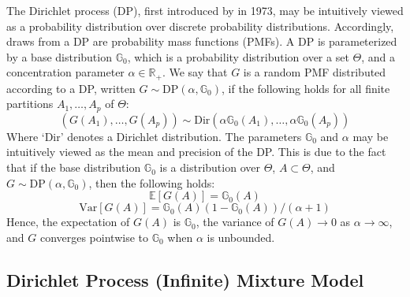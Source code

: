 \documentclass{article}
\begin{document}
The Dirichlet process (DP), first introduced by \cite{ferguson_1973} in 1973, may be intuitively viewed as a probability distribution over discrete probability distributions. Accordingly, draws from a DP are probability mass functions (PMFs). A DP is parameterized by a base distribution $\mathbb{G}_{0}$, which is a probability distribution over a set $\Theta$, and a concentration parameter $\alpha \in \mathbb{R}_{+}$. We say that $G$ is a random PMF distributed according to a DP, written $G \sim \text{DP}(\alpha, \mathbb{G}_{0})$, if the following holds for all finite partitions $A_{1}, \ldots, A_{p}$ of $\Theta$:
\begin{equation}
(G(A_{1}), \ldots, G(A_{p})) \sim \text{Dir}(\alpha \mathbb{G}_{0}(A_{1}), \ldots, \alpha \mathbb{G}_{0}(A_{p}))
\end{equation}
Where `Dir' denotes a Dirichlet distribution. The parameters $\mathbb{G}_{0}$ and $\alpha$ may be intuitively viewed as the mean and precision of the DP. This is due to the fact that if the base distribution $\mathbb{G}_{0}$ is a distribution over $\Theta$, $A \subset \Theta$, and $G \sim \text{DP}(\alpha, \mathbb{G}_{0})$, then the following holds:
\begin{equation}
\mathbb{E}[G(A)] = \mathbb{G}_{0}(A)
\end{equation}
\begin{equation}
\text{Var}[G(A)] = \mathbb{G}_{0}(A) (1 - \mathbb{G}_{0}(A)) / (\alpha + 1)
\end{equation}
Hence, the expectation of $G(A)$ is $\mathbb{G}_{0}$, the variance of $G(A) \rightarrow 0$ as $\alpha \rightarrow \infty$, and $G$ converges pointwise to $\mathbb{G}_{0}$ when $\alpha$ is unbounded.


\subsection{Dirichlet Process (Infinite) Mixture Model}
\label{sec:dpmixture}
\end{document}
